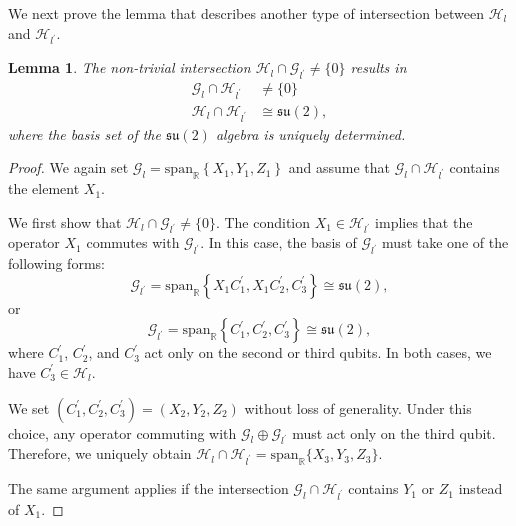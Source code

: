 \documentclass[aps,showpacs,amsmath,amssymb,twocolumn,prx,longbibliography,superscriptaddress,notitlepage,floatfix,10pt]{revtex4-2}
\newtheorem{lemma}{Lemma} %
\begin{document}
We next prove the lemma that describes another type of intersection between $\mathcal{H}_{l}$ and $\mathcal{H}_{l^{\prime}}$.

\begin{lemma}
The non-trivial intersection $\mathcal{H}_{l}\cap\mathcal{G}_{l^{\prime}}\neq\{0\}$ results in 
\begin{equation}
\begin{split}
    \mathcal{G}_{l}\cap\mathcal{H}_{l^{\prime}}&\neq\{0\}\\
        \mathcal{H}_{l}\cap\mathcal{H}_{l^{\prime}}&\cong \mathfrak{su}(2),
\end{split}
\end{equation}
where the basis set of the $\mathfrak{su}(2)$ algebra is uniquely determined.
\label{lemma:4}
\end{lemma}
\begin{proof}
    We again set $\mathcal{G}_{l}=\mathrm{span}_{\mathbb{R}}\left\{X_{1},Y_{1},Z_{1}\right\}$ and assume that $\mathcal{G}_{l}\cap\mathcal{H}_{l^{\prime}}$ contains the element $X_{1}$.

    We first show that $\mathcal{H}_{l}\cap\mathcal{G}_{l^{\prime}}\not=\{0\}$. The condition $X_{1}\in\mathcal{H}_{l^{\prime}}$ implies that the operator $X_{1}$ commutes with $\mathcal{G}_{l^{\prime}}$. In this case, the basis of $\mathcal{G}_{l^{\prime}}$ must take one of the following forms:
    \begin{equation}
        \mathcal{G}_{l^{\prime}}=\mathrm{span}_{\mathbb{R}}\left\{X_{1}C_{1}^{\prime},X_{1}C_{2}^{\prime},C_{3}^{\prime}\right\}\cong\mathfrak{su}(2),
    \end{equation}
    or
    \begin{equation}
        \mathcal{G}_{l^{\prime}}=\mathrm{span}_{\mathbb{R}}\left\{C_{1}^{\prime},C_{2}^{\prime},C_{3}^{\prime}\right\}\cong\mathfrak{su}(2),\label{eq:Glprim3}
    \end{equation}
    where $C_{1}^{\prime}$, $C_{2}^{\prime}$, and $C_{3}^{\prime}$ act only on the second or third qubits. In both cases, we have $C_{3}^{\prime}\in\mathcal{H}_{l}$.

    We set $(C_{1}^{\prime},C_{2}^{\prime},C_{3}^{\prime})=(X_{2},Y_{2},Z_{2})$ without loss of generality. Under this choice, any operator commuting with $\mathcal{G}_{l}\oplus\mathcal{G}_{l^{\prime}}$ must act only on the third qubit.
    Therefore, we uniquely obtain $\mathcal{H}_{l}\cap\mathcal{H}_{l^{\prime}}=\mathrm{span}_{\mathbb{R}}\{X_{3},Y_{3},Z_{3}\}$.

    The same argument applies if the intersection $\mathcal{G}_{l}\cap\mathcal{H}_{l^{\prime}}$ contains $Y_{1}$ or $Z_{1}$ instead of $X_{1}$.
\end{proof}
\end{document}
